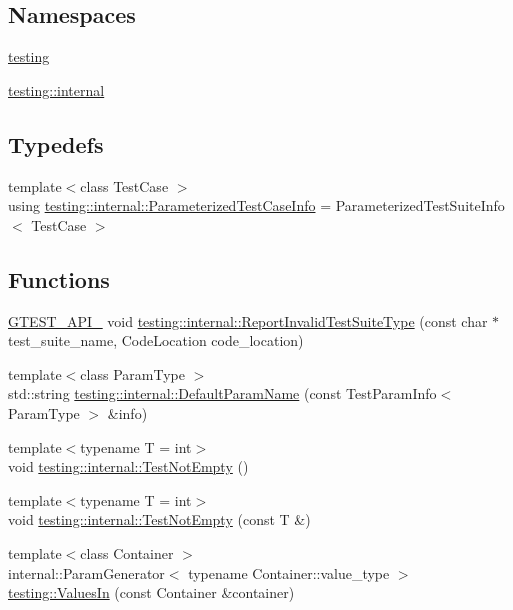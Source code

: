\subsection*{Namespaces}
\begin{DoxyCompactItemize}
\item 
 \mbox{\hyperlink{namespacetesting}{testing}}
\item 
 \mbox{\hyperlink{namespacetesting_1_1internal}{testing\+::internal}}
\end{DoxyCompactItemize}
\subsection*{Typedefs}
\begin{DoxyCompactItemize}
\item 
{\footnotesize template$<$class Test\+Case $>$ }\\using \mbox{\hyperlink{namespacetesting_1_1internal_aac31682b6b41997d6cc610a5787dc8bc}{testing\+::internal\+::\+Parameterized\+Test\+Case\+Info}} = Parameterized\+Test\+Suite\+Info$<$ Test\+Case $>$
\end{DoxyCompactItemize}
\subsection*{Functions}
\begin{DoxyCompactItemize}
\item 
\mbox{\hyperlink{_obj__test_2lib_2googletest-release-1_88_81_2googletest_2include_2gtest_2internal_2gtest-port_8h_aa73be6f0ba4a7456180a94904ce17790}{G\+T\+E\+S\+T\+\_\+\+A\+P\+I\+\_\+}} void \mbox{\hyperlink{namespacetesting_1_1internal_abbc0c3f8d5ee67a39d26167138effbe8}{testing\+::internal\+::\+Report\+Invalid\+Test\+Suite\+Type}} (const char $\ast$test\+\_\+suite\+\_\+name, Code\+Location code\+\_\+location)
\item 
{\footnotesize template$<$class Param\+Type $>$ }\\std\+::string \mbox{\hyperlink{namespacetesting_1_1internal_a954ec4a8a932dac7743e77e459ffefdc}{testing\+::internal\+::\+Default\+Param\+Name}} (const Test\+Param\+Info$<$ Param\+Type $>$ \&info)
\item 
{\footnotesize template$<$typename T  = int$>$ }\\void \mbox{\hyperlink{namespacetesting_1_1internal_aa07a04b597551a51d862911b22a94eb9}{testing\+::internal\+::\+Test\+Not\+Empty}} ()
\item 
{\footnotesize template$<$typename T  = int$>$ }\\void \mbox{\hyperlink{namespacetesting_1_1internal_ad2f14c6dc7d6c3d78884910943e11bc1}{testing\+::internal\+::\+Test\+Not\+Empty}} (const T \&)
\item 
{\footnotesize template$<$class Container $>$ }\\internal\+::\+Param\+Generator$<$ typename Container\+::value\+\_\+type $>$ \mbox{\hyperlink{namespacetesting_aa67d0c8470c5f69fcfcacc9e775fa982}{testing\+::\+Values\+In}} (const Container \&container)
\end{DoxyCompactItemize}
